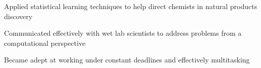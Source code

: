 \begin{cventries}
{\begin{cvitems}
    \item {Applied statistical learning techniques to help direct chemists in natural products discovery}
    \item {Communicated effectively with wet lab scientists to address problems from a computational perspective}
    \item {Became adept at working under constant deadlines and effectively multitasking}
\end{cvitems}
}
\end{cventries}
